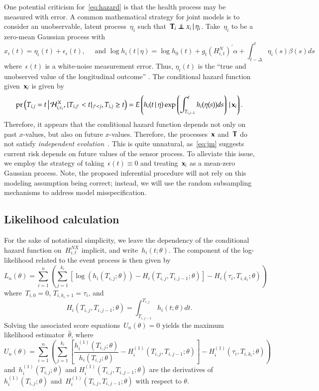 \documentclass[11pt]{amsart}
\def\pr{\mathop{\text{pr}}\nolimits}
\def\pr{\mathop{\text{pr}}\nolimits}
\def\indep{\mathrel{\rlap{$\perp$}\kern1.6pt\mathord{\perp}}}
\def\H{\mathcal{H}}
\def\given{\, | \,}
\def\Given{\, \big | \,}
\def\bfx{{\bf x}}
\def\bfT{{\bf T}}
\begin{document}
One potential criticism for~\eqref{eq:hazard} is that the health
process may be measured with error.  
A common mathematical strategy for joint models is to consider an
unobservable, latent process~$\eta_i$ such that~$\bfT_i \indep x_i
\given \eta_i$. Take~$\eta_i$ to be a zero-mean Gaussian process with 
\begin{equation}\label{eq:jm}
x_i(t) = \eta_i (t) + \epsilon_i (t),\quad \text{ and } \log h_i (t
\given \eta ) = \log h_0 (t) + g_t \left( H_{i,t}^N \right)^{\prime}
\alpha + \int_{t-\Delta}^t \eta_i (s) \beta (s) ds
\end{equation}
where~$\epsilon (t)$ is a white-noise measurement error. Thus,
$\eta_i (t)$ is the ``true and unobserved value of the longitudinal
outcome'' \citep[Sec. 2.1, pp.3]{Rizopoulos2010}. The conditional hazard
function given~$\bfx_i$ is given by
\[
\pr \left ( T_{i,j} = t \Given \H_{i,\tau_i}^X, \{ T_{i,j^\prime} < t \}_{j^\prime <
  j}, T_{i,j} \geq t \right) = E \left( h_i (t \given \eta) \exp
\left( \int_{T_{i,j-1}}^t h_i (\eta (s)) ds \right) \given \bfx_i
\right).
\]
Therefore, it appears that the conditional hazard function depends 
not only on past $x$-values, but also on future $x$-values.
Therefore, the processes~$\bfx$ and~$\bfT$ do not satisfy
\emph{independent evolution}~\citep{DempseyPMCC2}.
This is quite unnatural, as~\eqref{eq:jm} suggests current risk
depends on future values of the sensor process.
To alleviate this issue, we employ the strategy of taking~$\epsilon
(t) \equiv 0$ and treating~$\bfx_i$ as a mean-zero Gaussian process.
Note, the proposed inferential procedure will not rely on this
modeling assumption being correct; instead, we will use the random
subsampling mechanisms to address model misspecification.

\subsection{Likelihood calculation}  

For the sake of notational simplicity, we leave the dependency of the
conditional hazard function on~$H_{i,t}^{NX}$ implicit, and write~$h_i
(t; \theta)$. The component of the log-likelihood related to the event
process is then given by
\[
  L_n (\theta) = \sum_{i=1}^{n} \left ( \sum_{j=1}^{k_i} 
  \left[ \log \left( h_i \left( T_{i,j}; \theta
      \right) \right) - H_i \left( T_{i,j}, T_{i,j-1}; \theta \right) 
  \right] - H_{i} \left( \tau_i, T_{i,k_i}; \theta \right) \right) 
\]
where~$T_{i,0} = 0$, $T_{i, k_i + 1} = \tau_i$, and
\[
H_{i} (T_{i,j}, T_{i,j-1}; \theta) = \int_{T_{i,j-1}}^{T_{i,j}} h_{i} (t; \theta) dt.
\]
Solving the associated score equations~$U_n (\theta) = 0$ yields the
maximum likelihood estimator~$\hat \theta$, where
\[
U_n (\theta) = \sum_{i=1}^{n} \left ( \sum_{j=1}^{k_i} 
  \left[ \frac{h^{(1)}_i (T_{i,j}; \theta)}{h_i (T_{i,j}; \theta)} - H^{(1)}_i
    (T_{i,j}, T_{i,j-1}; \theta) \right]  - H^{(1)}_{i} (\tau_i,
  T_{i,k_i}; \theta) \right) 
\]
and~$h_i^{(1)} (T_{i,j}; \theta)$ and $H_i^{(1)} (T_{i,j}, T_{i,j-1}; \theta)$
are the derivatives of~$h_i^{(1)} (T_{i,j}; \theta)$ and~$H_i^{(1)}
(T_{i,j}, T_{i,j-1}; \theta)$ with respect to $\theta$.
\end{document}
